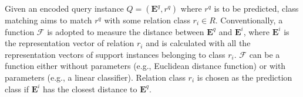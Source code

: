 Given an encoded query instance $Q=(\mathbf{E}^q, r^q)$ where $r^q$ is to be predicted, class matching aims to match $r^q$ with some relation class $r_i \in R$. Conventionally, a function $\mathcal{F}$ is adopted to measure the distance between $\mathbf{E}^q$ and $\mathbf{E}^{i}$, where $\mathbf{E}^{i}$ is the representation vector of relation $r_i$ and is calculated with all the representation vectors of support instances belonging to class $r_i$.
$\mathcal{F}$ can be a function either without parameters (e.g., Euclidean distance function) or with parameters (e.g., a linear classifier).
Relation class $r_i$ is chosen as the prediction class if $\mathbf{E}^i$ has the closest distance to $\mathbf{E}^q$.





